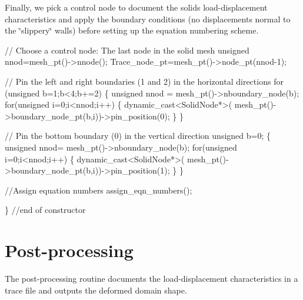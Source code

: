 Finally, we pick a control node to document the solid\textquotesingle{}s load-\/displacement characteristics and apply the boundary conditions (no displacements normal to the \char`\"{}slippery\char`\"{} walls) before setting up the equation numbering scheme.


\begin{DoxyCodeInclude}
 
 
 \textcolor{comment}{// Choose a control node: The last node in the solid mesh}
 \textcolor{keywordtype}{unsigned} nnod=mesh\_pt()->nnode();
 Trace\_node\_pt=mesh\_pt()->node\_pt(nnod-1);
 
\textcolor{comment}{// Pin the left and right boundaries (1 and 2) in the horizontal directions}
 \textcolor{keywordflow}{for} (\textcolor{keywordtype}{unsigned} b=1;b<4;b+=2)
  \{
   \textcolor{keywordtype}{unsigned} nnod = mesh\_pt()->nboundary\_node(b);
   \textcolor{keywordflow}{for}(\textcolor{keywordtype}{unsigned} i=0;i<nnod;i++)
    \{
     \textcolor{keyword}{dynamic\_cast<}SolidNode*\textcolor{keyword}{>}(
      mesh\_pt()->boundary\_node\_pt(b,i))->pin\_position(0);
    \}
  \}
 
\textcolor{comment}{// Pin the bottom boundary (0) in the vertical direction}
 \textcolor{keywordtype}{unsigned} b=0;
 \{
  \textcolor{keywordtype}{unsigned} nnod= mesh\_pt()->nboundary\_node(b);
  \textcolor{keywordflow}{for}(\textcolor{keywordtype}{unsigned} i=0;i<nnod;i++)
   \{
    \textcolor{keyword}{dynamic\_cast<}SolidNode*\textcolor{keyword}{>}(
     mesh\_pt()->boundary\_node\_pt(b,i))->pin\_position(1);
   \}
 \}
 
 \textcolor{comment}{//Assign equation numbers}
 assign\_eqn\_numbers();

\} \textcolor{comment}{//end of constructor}

\end{DoxyCodeInclude}




 

\hypertarget{index_doc}{}\section{Post-\/processing}\label{index_doc}
The post-\/processing routine documents the load-\/displacement characteristics in a trace file and outputs the deformed domain shape.


